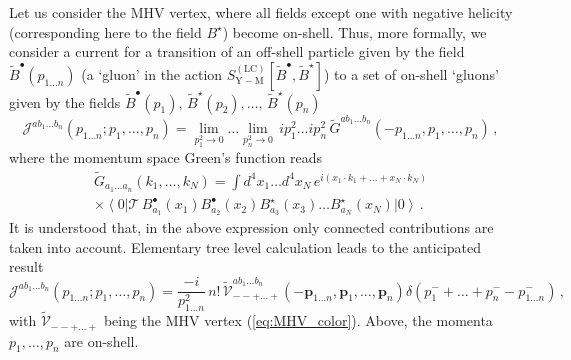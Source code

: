 \documentclass[english,american]{article}
\begin{document}
Let us consider the MHV vertex, where all fields except one with negative
helicity (corresponding here to the field $B^{\star}$) become on-shell.
Thus, more formally, we consider a current for a transition of an
off-shell particle given by the field $\tilde{B}^{\bullet}\left(p_{1\dots n}\right)$ (a
`gluon' in the action $S_{\mathrm{Y-M}}^{\left(\mathrm{LC}\right)}\left[\tilde{B}^{\bullet},\tilde{B}^{\star}\right]$)
to a set of on-shell `gluons' given by the  fields $\tilde{B}^{\bullet}\left(p_{1}\right),\,\tilde{B}^{\star}\left(p_{2}\right),\dots,\,\tilde{B}^{\star}\left(p_{n}\right)$
\begin{equation}
\mathcal{J}^{ab_{1}\dots b_{n}}\left(p_{1\dots n};p_{1},\dots,p_{n}\right)=\lim_{p_{1}^{2}\rightarrow0}\dots\lim_{p_{n}^{2}\rightarrow0}\, ip_{1}^{2}\dots ip_{n}^{2}\,\tilde{G}^{ab_{1}\dots b_{n}}\left(-p_{1\dots n},p_{1},\dots,p_{n}\right)\,,
\end{equation}
where the momentum space Green's function reads
\begin{multline}
\tilde{G}_{a_{1}\dots a_{n}}\left(k_{1},\dots,k_{N}\right)=\int d^{4}x_{1}\dots d^{4}x_{N}\, e^{i\left(x_{1}\cdot k_{1}+\dots+x_{N}\cdot k_{N}\right)}\\
\times\left\langle 0\right|\mathcal{T}\, B_{a_{1}}^{\bullet}\left(x_{1}\right)B_{a_{2}}^{\bullet}\left(x_{2}\right)B_{a_{3}}^{\star}\left(x_{3}\right)\dots B_{a_{N}}^{\star}\left(x_{N}\right)\left|0\right\rangle \,.
\end{multline}
It is understood that, in the above expression  only connected contributions are taken into account. Elementary
tree level calculation leads to the anticipated result 
\begin{equation}
\mathcal{J}^{ab_{1}\dots b_{n}}\left(p_{1\dots n};p_{1},\dots,p_{n}\right)=\frac{-i}{p_{1\dots n}^{2}}\, n!\,\tilde{\mathcal{V}}_{--+\dots+}^{ab_{1}\dots b_{n}}\left(-\mathbf{p}_{1\dots n},\mathbf{p}_{1},\dots,\mathbf{p}_{n}\right)\delta\left(p_{1}^{-}+\dots+p_{n}^{-}-p_{1\dots n}^{-}\right)\,,\label{eq:CSW_current1}
\end{equation}
with $\tilde{\mathcal{V}}_{--+\dots+}$ being the MHV vertex (\ref{eq:MHV_color}). Above,  the momenta $p_1,\dots ,p_n$ are on-shell.
\end{document}
